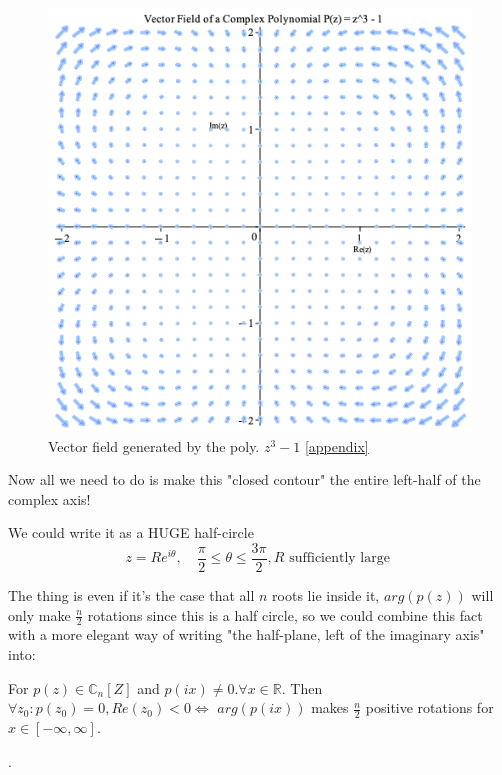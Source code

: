 \begin{figure}[H]
\centering
\includegraphics[width=\textwidth-7cm]{math_pics/polynomial-vectorfield.png}
\caption{Vector field generated by the poly. $z^3-1$ \ref{appendix}}
\label{fig:complex-polynomial-vectorfield}
\end{figure}

Now all we need to do is make this "closed contour" the entire
left-half of the complex axis!

We could write it as a {\large HUGE} half-circle
\[
z = Re^{i \theta}, \quad \frac{\pi}{2} \leq \theta \leq \frac{3
\pi}{2}, R \text{ sufficiently large }
\]

The thing is even if it's the case that all $n$ roots lie inside it,
$arg(p(z))$ will only make $\frac{n}{2}$ rotations since this is a
half circle, so we could combine this fact with a more elegant way of
writing "the half-plane, left of the imaginary axis" into:

\begin{lemma}\label{cauchy_arg_lemma}
For $p(z) \in \mathbb{C}_n[Z]$ and $p(ix) \neq 0. \forall x \in
\mathbb{R}$. Then $\forall z_0 : p(z_0) = 0, Re(z_0) < 0 \iff$
$arg(p(ix))$ makes $\frac{n}{2}$ positive rotations for $x \in
[-\infty , \infty]$.
\end{lemma}

.

